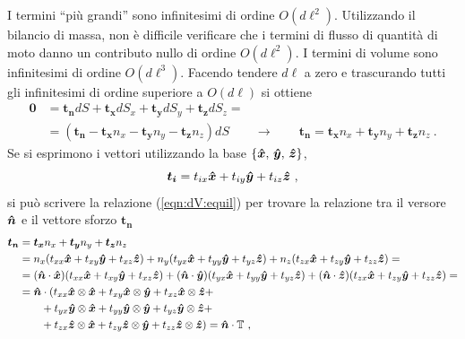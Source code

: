 I termini ``più grandi'' sono infinitesimi di ordine $O(d\ell^2)$.
Utilizzando il bilancio di massa, non è difficile verificare che i termini di flusso di quantità di moto danno un contributo nullo di ordine $O(d\ell^2)$. I termini di volume sono infinitesimi di ordine $O(d\ell^3)$.
Facendo tendere $d\ell$ a zero e trascurando tutti gli infinitesimi di ordine superiore a $O(d\ell)$ si ottiene
\begin{equation}\label{eqn:dV:equil}
\begin{aligned}
 \bm{0} & = \bm{t_n} dS + \bm{t_x} dS_x + \bm{t_y} dS_y + \bm{t_z} dS_z = \\
  & = ( \bm{t_n} - \bm{t_x} n_x - \bm{t_y} n_y - \bm{t_z} n_z ) dS  \qquad \rightarrow \qquad \bm{t_n} = \bm{t_x} n_x + \bm{t_y} n_y + \bm{t_z} n_z \ .
\end{aligned}
\end{equation}
Se si esprimono i vettori utilizzando la base $\{\bm{\hat{x}}, \, \bm{\hat{y}}, \, \bm{\hat{z}} \}$,
\begin{equation}\label{eqn:t:comp}
  \bm{t_i} = t_{ix} \bm{\hat{x}} + t_{iy} \bm{\hat{y}} + t_{iz} \bm{\hat{z}} \ ,
\end{equation}
si può scrivere la relazione (\ref{eqn:dV:equil}) per trovare la relazione tra il versore $\bm{\hat{n}}$ e il vettore sforzo $\bm{t_n}$
\begin{equation}
\begin{aligned}
  \bm{t_n} & = \bm{t_x} n_x + \bm{t_y} n_y + \bm{t_z} n_z \\ 
 & = n_x ( t_{xx} \bm{\hat{x}} + t_{xy} \bm{\hat{y}} +  t_{xz} \bm{\hat{z}} ) %
   + n_y ( t_{yx} \bm{\hat{x}} + t_{yy} \bm{\hat{y}} +  t_{yz} \bm{\hat{z}} ) %
   + n_z ( t_{zx} \bm{\hat{x}} + t_{zy} \bm{\hat{y}} +  t_{zz} \bm{\hat{z}} ) = \\
 & = ( \bh{n} \cdot \bh{x} ) ( t_{xx} \bm{\hat{x}} + t_{xy} \bm{\hat{y}} +  t_{xz} \bm{\hat{z}} )%
   + ( \bh{n} \cdot \bh{y} ) ( t_{yx} \bm{\hat{x}} + t_{yy} \bm{\hat{y}} +  t_{yz} \bm{\hat{z}} )%
   + ( \bh{n} \cdot \bh{z} ) ( t_{zx} \bm{\hat{x}} + t_{zy} \bm{\hat{y}} +  t_{zz} \bm{\hat{z}} ) = \\
    & = \bh{n} \cdot ( t_{xx} \bm{\hat{x}} \otimes \bm{\hat{x}} + 
                       t_{xy} \bm{\hat{x}} \otimes \bm{\hat{y}} +
                       t_{xz} \bm{\hat{x}} \otimes \bm{\hat{z}} + \\
            & \qquad + t_{yx} \bm{\hat{y}} \otimes \bm{\hat{x}} + 
                       t_{yy} \bm{\hat{y}} \otimes \bm{\hat{y}} +
                       t_{yz} \bm{\hat{y}} \otimes \bm{\hat{z}} + \\
            & \qquad + t_{zx} \bm{\hat{z}} \otimes \bm{\hat{x}} + 
                       t_{zy} \bm{\hat{z}} \otimes \bm{\hat{y}} +
                       t_{zz} \bm{\hat{z}} \otimes \bm{\hat{z}} ) =
     \bm{\hat{n}} \cdot \mathbb{T}  \ ,
\end{aligned}  
\end{equation}
